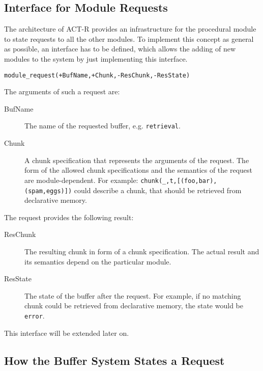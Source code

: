 \subsection{Interface for Module Requests}
\label{interface_for_module_requests}

The architecture of ACT-R provides an infrastructure for the procedural module to state requests to all the other modules. To implement this concept as general as possible, an interface has to be defined, which allows the adding of new modules to the system by just implementing this interface.

\begin{lstlisting}[caption={Simple Interface ``Module''},label=lst:interface_module]
module_request(+BufName,+Chunk,-ResChunk,-ResState)
\end{lstlisting}

The arguments of such a request are:

\begin{description}
 \item[BufName] The name of the requested buffer, e.g. \verb|retrieval|.
 \item[Chunk] A chunk specification that represents the arguments of the request. The form of the allowed chunk specifications and the semantics of the request are module-dependent. For example: \verb|chunk(_,t,[(foo,bar),(spam,eggs)])| could describe a chunk, that should be retrieved from declarative memory.
\end{description}

The request provides the following result:

\begin{description}
 \item[ResChunk] The resulting chunk in form of a chunk specification. The actual result and its semantics depend on the particular module.
 \item[ResState] The state of the buffer after the request. For example, if no matching chunk could be retrieved from declarative memory, the state would be \verb|error|.
\end{description}

This interface will be extended later on.

\subsection{How the Buffer System States a Request}
\label{how_the_buffer_system_states_a_request}

